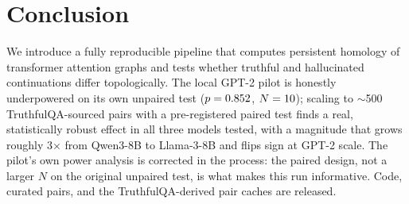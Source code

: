 \section{Conclusion}
We introduce a fully reproducible pipeline that computes persistent
homology of transformer attention graphs and tests whether truthful and
hallucinated continuations differ topologically. The local GPT-2 pilot is
honestly underpowered on its own unpaired test ($p=0.852$,
$N=10$); scaling to $\sim$500 TruthfulQA-sourced pairs with a
pre-registered paired test finds a real, statistically robust effect in
all three models tested, with a magnitude that grows roughly 3$\times$
from Qwen3-8B to Llama-3-8B and flips sign at GPT-2 scale. The pilot's own
power analysis is corrected in the process: the paired design, not a
larger $N$ on the original unpaired test, is what makes this run
informative. Code, curated pairs, and the TruthfulQA-derived pair caches
are released.

